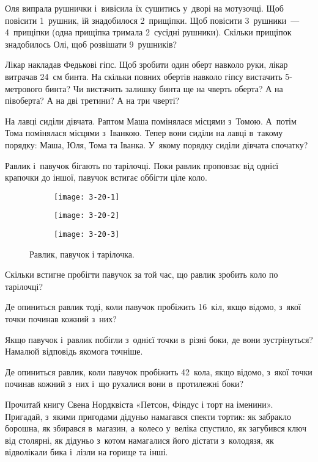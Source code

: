 \problem
Оля випрала рушнички і~вивісила їх сушитись у~дворі на мотузочці.
Щоб повісити 1~рушник, їй знадобилося 2~прищіпки.
Щоб повісити 3~рушники~--- 4~прищіпки (одна прищіпка тримала 2~сусідні рушники).
Скільки прищіпок знадобилось Олі, щоб розвішати 9~рушників?


\problem
Лікар накладав Федькові гіпс.
Щоб зробити один оберт навколо руки, лікар витрачав 24~см бинта.
На скільки повних обертів навколо гіпсу вистачить 5-метрового бинта?
Чи вистачить залишку бинта ще на чверть оберта?
А на півоберта?
А на дві третини?
А на три чверті?


\problem
На лавці сиділи дівчата. Раптом Маша помінялася місцями з~Томою.
А~потім Тома помінялася місцями з~Іванкою.
Тепер вони сиділи на лавці в~такому порядку: Маша, Юля, Тома та Іванка.
У~якому порядку сиділи дівчата спочатку?


\problem
{}
Равлик і~павучок бігають по тарілочці.
Поки равлик проповзає від однієї крапочки до іншої,
павучок встигає оббігти ціле коло.

\begin{figure}[ht]
  \centering
  \begin{subfigure}{0.2\textwidth}
    \texttt{[image: 3-20-1]}
  \end{subfigure}
  \quad
  \begin{subfigure}{0.4\textwidth}
    \texttt{[image: 3-20-2]}
  \end{subfigure}
  \quad
  \begin{subfigure}{0.2\textwidth}
    \texttt{[image: 3-20-3]}
  \end{subfigure}
  \caption{Равлик, павучок і тарілочка.}
  \label{fig:snail-spider-plate}
\end{figure}

Скільки встигне пробігти павучок за той час,
що равлик зробить коло по тарілочці?

Де опиниться равлик тоді, коли павучок пробіжить 16~кіл,
якщо відомо, з~якої точки починав кожний з~них?

Якщо павучок і~равлик побігли з~однієї точки в~різні боки,
де вони зустрінуться?
Намалюй відповідь якомога точніше.

Де опиниться равлик, коли павучок пробіжить 42~кола, якщо відомо,
з~якої точки починав кожний з~них і~що рухалися вони в~протилежні боки?


\problem
Прочитай книгу Свена Нордквіста «Петсон, Фіндус і торт на іменини». Пригадай,
з~якими пригодами дідуньо намагався спекти тортик: як забракло борошна,
як збирався в~магазин, а~колесо у~веліка спустило, як загубився ключ
від столярні, як дідуньо з~котом намагалися його дістати з~колодязя,
як відволікали бика і~лізли на горище та інші.

